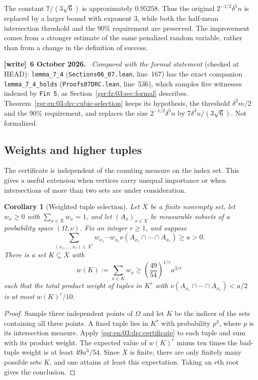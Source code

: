 \documentclass[11pt,letterpaper]{article}
\numberwithin{equation}{section}
\newtheorem{corollary}[theorem]{Corollary}
\theoremstyle{definition}
\theoremstyle{remark}
\newcommand{\1}{\mathbf 1}
\newcommand{\file}[1]{\nolinkurl{#1}}
\newenvironment{writenote}[1][]{\par\smallskip\begingroup\small
 \noindent\textbf{[write]}\if\relax\detokenize{#1}\relax\else~\textbf{#1.}\fi\ }%
 {\par\endgroup\smallskip}
\begin{document}
The constant $7/(3\sqrt6)$ is approximately $0.95258$.  Thus the original
$2^{-1/2}\delta^5n$ is replaced by a larger bound with exponent $3$, while
both the half-mean intersection threshold and the $90\%$ requirement are
preserved.  The improvement comes from a stronger estimate of the same
penalized random variable, rather than from a change in the definition of
success.
\begin{writenote}[6 October 2026]
\emph{Compared with the formal statement} (checked at HEAD): \file{lemma_7_4} (\file{Sections06\_07.lean}, line~167) has the exact companion \file{lemma_7_4_holds} (\file{Proofs07DRC.lean}, line~536), which samples five witnesses indexed by \texttt{Fin 5}, as Section~\ref{gsr:fz:03:sec:formal} describes. Theorem~\ref{gsr:en:03:drc:cubic-selection} keeps its hypothesis, the threshold $\delta^2m/2$ and the $90\%$ requirement, and replaces the size $2^{-1/2}\delta^5n$ by $7\delta^3n/(3\sqrt6)$. Not formalized.
\end{writenote}

\subsection{Weights and higher tuples}

The certificate is independent of the counting measure on the index set.
This gives a useful extension when vertices carry unequal importance or
when intersections of more than two sets are under consideration.

\begin{corollary}[Weighted tuple selection]\label{gsr:en:03:drc:weighted}
Let $X$ be a finite nonempty set, let $w_x\geq0$ with
$\sum_{x\in X}w_x=1$, and let $(A_x)_{x\in X}$ be measurable subsets of a
probability space $(\Omega,\nu)$.  Fix an integer $r\geq1$, and suppose
\[
 \sum_{(x_1,\ldots,x_r)\in X^r}
   w_{x_1}\cdots w_{x_r}
   \nu(A_{x_1}\cap\cdots\cap A_{x_r})\geq a>0.
\]
There is a set $K\subseteq X$ with
\[
 w(K):=\sum_{x\in K}w_x
 \geq\left(\frac{49}{54}\right)^{1/r}a^{3/r}
\]
such that the total product weight of tuples in $K^r$ with
$\nu(A_{x_1}\cap\cdots\cap A_{x_r})<a/2$ is at most
$w(K)^r/10$.
\end{corollary}

\begin{proof}
Sample three independent points of $\Omega$ and let $K$ be the indices of
the sets containing all three points.  A fixed tuple lies in $K^r$ with
probability $p^3$, where $p$ is its intersection measure.  Apply
\eqref{gsr:en:03:drc:certificate} to each tuple and sum with its product weight.
The expected value of $w(K)^r$ minus ten times the bad-tuple weight is at
least $49a^3/54$.  Since $X$ is finite, there are only finitely many possible
sets $K$, and one attains at least this expectation.  Taking an $r$th root
gives the conclusion.
\end{proof}
\end{document}
